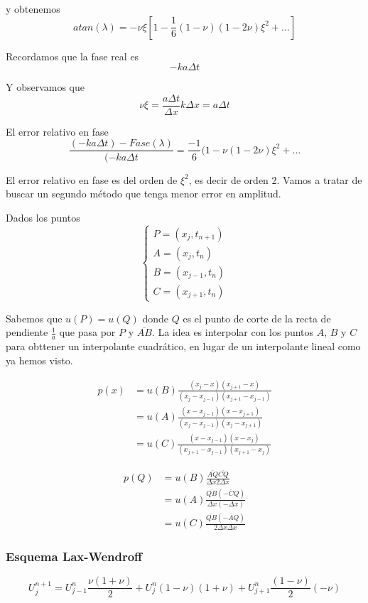 y obtenemos 
$$atan(\lambda) = -\nu \xi\left[1-\frac{1}{6}(1-\nu)(1-2\nu)\xi^2+\hdots\right]$$

Recordamos que la fase real es
$$-ka\Delta t$$

Y observamos que
$$\nu\xi = \frac{a\Delta t}{\Delta x}k\Delta x = a\Delta t$$

El error relativo en fase
$$\frac{(-ka\Delta t)-Fase(\lambda)}{(-ka\Delta t} = \frac{-1}{6}(1-\nu(1-2\nu)\xi^2+\hdots$$

El error relativo en fase es del orden de $\xi^2$, es decir de orden 2. Vamos a tratar de buscar un segundo método que tenga menor error en amplitud.

Dados los puntos
\begin{equation*}
	\left\{
	\begin{array}{l}
		P = (x_j, t_{n+1})\\
		A = (x_j, t_n)\\
		B = (x_{j-1}, t_n)\\
		C = (x_{j+1}, t_n)
	\end{array}
	\right.
\end{equation*}

Sabemos que $u(P) = u(Q)$ donde $Q$ es el punto de corte de la recta de pendiente $\frac{1}{a}$ que pasa por $P$ y $\overline{AB}$. La idea es interpolar con los puntos $A$, $B$ y $C$ para obttener un interpolante cuadrático, en lugar de un interpolante lineal como ya hemos visto.

\begin{align*}
	p(x) &= u(B)\frac{(x_j-x)(x_{j+1}-x)}{(x_j-x_{j-1})(x_{j+1}-x_{j-1})}\\
	&= u(A)\frac{(x-x_{j-1})(x-x_{j+1})}{(x_j-x_{j-1})(x_{j}-x_{j+1})}\\
	&= u(C)\frac{(x-x_{j-1})(x-x_{j})}{(x_{j+1}-x_{j-1})(x_{j+1}-x_{j})}
\end{align*}

\begin{align*}
	p(Q) &= u(B)\frac{\overline{AQ}\overline{CQ}}{\Delta x2\Delta x}\\
	&= u(A)\frac{\overline{QB}(\overline{-CQ})}{\Delta x(-\Delta x)}\\
	&= u(C)\frac{\overline{QB}(\overline{-AQ})}{2\Delta x\Delta x}
\end{align*}

\subsubsection{Esquema Lax-Wendroff}
$$U_j^{n+1}=U_{j-1}^n\frac{\nu(1+\nu)}{2}+U_j^n (1-\nu)(1+\nu)+U_{j+1}^n\frac{(1-\nu)}{2}(-\nu)$$

